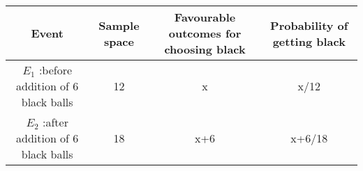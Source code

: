 \begin{tabular}{|c|c|c|c|}
\hline
Event	&Sample space	&Favourable outcomes for choosing  black	&Probability of getting black\\
\hline
 $E_1$ :before addition of 6 black balls	&12	&x	&x/12\\
\hline
$E_2$ :after addition of 6 black balls	&18	&x+6	&x+6/18\\
\hline
\end{tabular}
